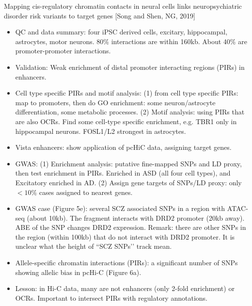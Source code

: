 \documentclass{report}
\begin{document}
Mapping cis-regulatory chromatin contacts in neural cells links neuropsychiatric disorder risk variants to target genes [Song and Shen, NG, 2019]
\begin{itemize}
	\item QC and data summary: four iPSC derived cells, excitary, hippocampal, astrocytes, motor neurons. 80\% interactions are within 160kb. About 40\% are promoter-promoter interactions.
	
	\item Validation: Weak enrichment of distal promoter interacting regions (PIRs) in enhancers.
	
	\item Cell type specific PIRs and motif analysis: (1) from cell type specific PIRs: map to promoters, then do GO enrichment: some neuron/astrocyte differentiation, some metabolic processes. (2) Motif analysis: using PIRs that are also OCRs. Find some cell-type specific enrichment, e.g. TBR1 only in hippocampal neurons. FOSL1/L2 strongest in astrocytes.
	
	\item Vista enhancers: show application of pcHiC data, assigning target genes.
	
	\item GWAS: (1) Enrichment analysis: putative fine-mapped SNPs and LD proxy, then test enrichment in PIRs. Enriched in ASD (all four cell types), and Excitatory enriched in AD. (2) Assign gene targets of SNPs/LD proxy: only $<10\%$ cases assigned to nearest genes.
	
	\item GWAS case (Figure 5e): several SCZ associated SNPs in a region with ATAC-seq (about 10kb). The fragment interacts with DRD2 promoter (20kb away). ABE of the SNP changes DRD2 expression. Remark: there are other SNPs in the region (within 100kb) that do not interact with DRD2 promoter. It is unclear what the height of ``SCZ SNPs’’ track mean.
	
	\item Allele-specific chromatin interactions (PIRs): a significant number of SNPs showing allelic bias in pcHi-C (Figure 6a).
	
	\item Lesson: in Hi-C data, many are not enhancers (only 2-fold enrichment) or OCRs. Important to intersect PIRs with regulatory annotations.
\end{itemize}
\end{document}
